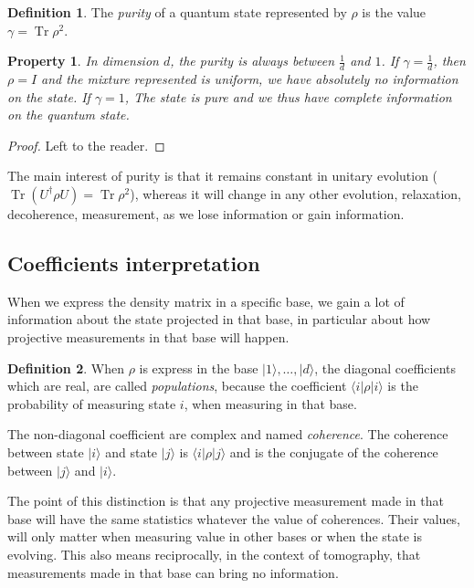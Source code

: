 \documentclass[10pt,a4paper]{report}
\theoremstyle{plain}
\newtheorem{prop}[thm]{Property}
\theoremstyle{definition}
\newtheorem{defn}{Definition}[chapter]
\theoremstyle{remark}
\newcommand{\TODO}{\textbf{TODO}}
\newcommand{\ket}[1]{|#1\rangle}
\newcommand{\bra}[1]{\langle#1|}
\DeclareMathOperator{\Tr}{Tr}
\begin{document}
\begin{defn}
  The \emph{purity} of a quantum state represented by $\rho$ is the value $\gamma = \Tr \rho^2$.
\end{defn}

\begin{prop}
  In dimension $d$, the purity is always between $\frac1d$ and $1$. If $\gamma =
  \frac1d$, then $\rho = I$ and the mixture represented is uniform, we have
  absolutely no information on the state. If $\gamma = 1$, The state is pure and
  we thus have complete information on the quantum state.
\end{prop}

\begin{proof}
  Left to the reader.
\end{proof}

The main interest of purity is that it remains constant in unitary evolution
($\Tr (U^\dagger \rho U) = \Tr \rho^2$),
whereas it will change in any other evolution, relaxation, decoherence,
measurement, as we lose information or gain information.

\subsection{Coefficients interpretation}

When we express the density matrix in a specific base, we gain a lot of
information about the state projected in that base, in particular about how
projective measurements in that base will happen.

\begin{defn}
  When $\rho$ is express in the base $\ket 1, \ldots, \ket d$, the diagonal
  coefficients which are real, are called \emph{populations}, because the
  coefficient $\bra i \rho \ket i$ is the probability of measuring state $i$,
  when measuring in that base.

  The non-diagonal coefficient are complex and named \emph{coherence}. The
  coherence between state $\ket i$ and state $\ket j$ is $\bra i \rho \ket j$
  and is the conjugate of the coherence between $\ket j$ and $\ket i$.
\end{defn}

The point of this distinction is that any projective measurement made in that
base will have the same statistics whatever the value of coherences. Their
values, will only matter when measuring value in other bases or when the state
is evolving. This also means reciprocally, in the context of tomography,
that measurements made in that base can bring no information.
\end{document}
